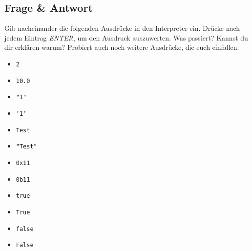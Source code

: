 \subsection{Frage \& Antwort}

Gib nacheinander die folgenden Ausdrücke in den Interpreter ein. Drücke nach
jedem Eintrag \textit{ENTER}, um den Ausdruck auszuwerten. Was passiert?
Kannst du dir erklären warum? Probiert auch noch weitere Ausdrücke, die euch
einfallen.

\begin{multicols}{3}
    \begin{itemize}
        \item \texttt{2}
        \item \texttt{10.0}
        \item \texttt{"1"}
        \item \texttt{'1'}
        \item \texttt{Test}
        \item \texttt{"Test"}
        \item \texttt{0x11}
        \item \texttt{0b11}
        \item \texttt{true}
        \item \texttt{True}
        \item \texttt{false}
        \item \texttt{False}
    \end{itemize}
\end{multicols}

